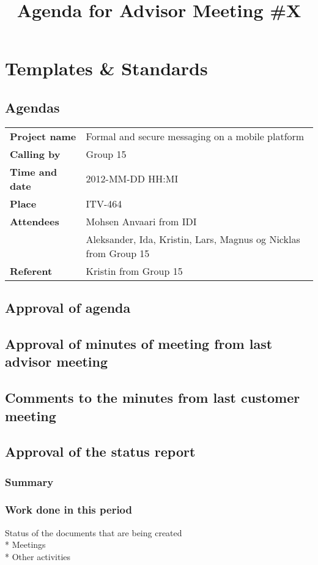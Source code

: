 \chapter{Templates \& Standards}

\section{Agendas}

\title{Agenda for Advisor Meeting \#X}
\maketitle
\begin{tabular}{>{\bfseries}l l}	
Project name&Formal and secure messaging on a mobile platform\\
Calling by&Group 15\\
Time and date&2012-MM-DD HH:MI\\
Place&ITV-464\\
Attendees&Mohsen Anvaari from IDI\\
 & Aleksander, Ida, Kristin, Lars, Magnus og Nicklas from Group 15\\
Referent&Kristin from Group 15\\
\end{tabular}

\section{Approval of agenda}
\section{Approval of minutes of meeting from last advisor meeting}
\section{Comments to the minutes from last customer meeting}
\section{Approval of the status report}
\subsection{Summary}
\subsection{Work done in this period}
Status of the documents that are being created\\*
Meetings\\*
Other activities
